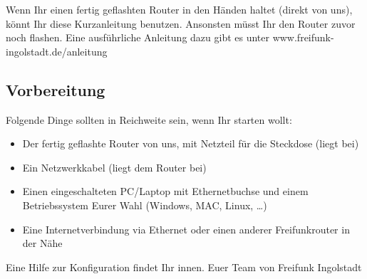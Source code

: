 \documentclass[10pt]{extarticle}
\begin{document}
\begin{multicols}{2}
Wenn Ihr einen fertig geflashten Router in den Händen haltet (direkt von uns), könnt Ihr diese Kurzanleitung benutzen. Ansonsten müsst Ihr den Router zuvor noch flashen. Eine ausführliche Anleitung dazu gibt es unter www.freifunk-ingolstadt.de/anleitung
\vfil
\subsection*{Vorbereitung}
Folgende Dinge sollten in Reichweite sein, wenn Ihr starten wollt:\\
\begin{itemize}
	\item Der fertig geflashte Router von uns, mit Netzteil für die Steckdose (liegt bei)
  \item Ein Netzwerkkabel (liegt dem Router bei)
  \item Einen eingeschalteten PC/Laptop mit Ethernetbuchse und einem Betriebssystem Eurer Wahl (Windows, MAC, Linux, …)
	\item Eine Internetverbindung via Ethernet oder einen anderer Freifunkrouter in der Nähe
\end{itemize}
\vfill
Eine Hilfe zur Konfiguration findet Ihr innen. 
\vfill
Euer Team von Freifunk Ingolstadt
\end {multicols}
\newpage
\end{document}
